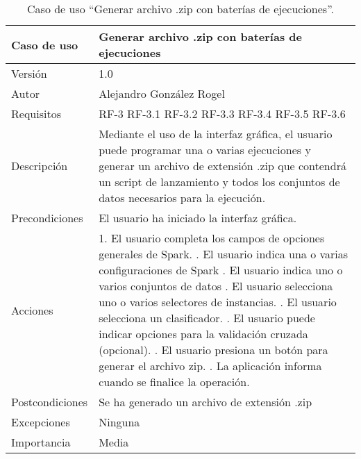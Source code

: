  
\begin{table}
  \begin{center}
   \begin{tabular}{|>{} L{3cm} | L{9cm} |}
    \hline
    Caso de uso & Generar archivo .zip con baterías de ejecuciones\\
    \hline
    Versión & 1.0 \\
    \hline
    Autor & Alejandro González Rogel \\
    \hline
    Requisitos & 
    		RF-3\newline
    		RF-3.1\newline
		RF-3.2\newline
		RF-3.3\newline
		RF-3.4\newline
		RF-3.5\newline
		RF-3.6\\
    \hline
    Descripción & Mediante el uso de la interfaz gráfica, el usuario puede programar una o varias ejecuciones y generar un archivo de extensión .zip que contendrá un script de lanzamiento y todos los conjuntos de datos necesarios para la ejecución.\\
    \hline
    Precondiciones & El usuario ha iniciado la interfaz gráfica. \\
    \hline
    Acciones & 1. El usuario completa los campos de opciones generales de Spark. . El usuario indica una o varias configuraciones de Spark . El usuario indica uno o varios conjuntos de datos . El usuario selecciona uno o varios selectores de instancias. . El usuario selecciona un clasificador. . El usuario puede indicar opciones para la validación cruzada (opcional). . El usuario presiona un botón para generar el archivo zip. . La aplicación informa cuando se finalice la operación.
    			   \\
    \hline
    Postcondiciones & Se ha generado un archivo de extensión .zip \\
    \hline
    Excepciones & Ninguna \\
    \hline
    Importancia & Media \\
    \hline
   \end{tabular}
   \caption{Caso de uso ``Generar archivo .zip con baterías de ejecuciones''.}
   \label{tabla:casoUso3}
  \end{center}
 \end{table}  
 
